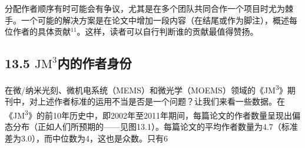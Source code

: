 分配作者顺序有时可能会有争议，尤其是在多个团队共同合作一个项目时尤为棘手。一个可能的解决方案是在论文中增加一段内容（在结尾或作为脚注），概述每位作者的具体贡献${ }^{11}$。这样，读者可以自行判断谁的贡献最值得赞扬。

\subsection*{13.5 $\mathrm{JM}^{3}$内的作者身份}
在微/纳米光刻、微机电系统（MEMS）和微光学（MOEMS）领域的《JM\textsuperscript{3}》期刊中，对上述作者标准的运用不当是否是一个问题？让我们来看一些数据。在《JM\textsuperscript{3}》的前10年历史中，即2002年至2011年期间，每篇论文的作者数量呈现出偏态分布（正如人们所预期的——见图13.1）。每篇论文的平均作者数量为4.7（标准差为3.0），而中位数为4，这也是众数。只有6%

